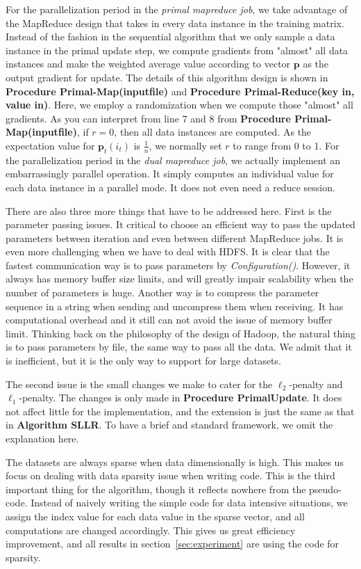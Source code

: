 \documentclass[10pt, conference, compsocconf]{IEEEtran}
\newcommand{\bp}{\mathbf{p}}
\begin{document}
For the parallelization period in the \textit{primal mapreduce job}, we take advantage of the MapReduce design that takes in every data instance in the training matrix.
Instead of the fashion in the sequential algorithm that we only sample a data instance in the primal update step, we compute gradients from "almost" all data instances and make the weighted average value according to vector $\bp$ as the output gradient for update.
The details of this algorithm design is shown in \textbf{Procedure Primal-Map(inputfile)} and \textbf{Procedure Primal-Reduce(key in, value in)}.
Here, we employ a randomization when we compute those "almost" all gradients.
As you can interpret from line 7 and 8 from \textbf{Procedure Primal-Map(inputfile)}, if $r=0$, then all data instances are computed.
As the expectation value for $\bp_t(i_t)$ is $\frac{1}{n}$, we normally set $r$ to range from 0 to 1.
For the parallelization period in the \textit{dual mapreduce job}, we actually implement an embarrassingly parallel operation.
It simply computes an individual value for each data instance in a parallel mode. It does not even need a reduce session.

There are also three more things that have to be addressed here.
First is the parameter passing issues. It critical to choose an efficient way to pass the updated parameters between iteration and even between different MapReduce jobs.
It is even more challenging when we have to deal with HDFS. It is clear that the fastest communication way is to pass parameters by \textit{Configuration()}.
However, it always has memory buffer size limits, and will greatly impair scalability when the number of parameters is huge.
Another way is to compress the parameter sequence in a string when sending and uncompress them when receiving. It has computational overhead and it still can not avoid the issue of memory buffer limit.
Thinking back on the philosophy of the design of Hadoop, the natural thing is to pass parameters by file, the same way to pass all the data.
We admit that it is inefficient, but it is the only way to support for large datasets.

The second issue is the small changes we make to cater for the $\ell_2$-penalty and $\ell_1$-penalty. The changes is only made in \textbf{Procedure PrimalUpdate}.
It does not affect little for the implementation, and the extension is just the same as that in \textbf{Algorithm SLLR}.
To have a brief and standard framework, we omit the explanation here.

The datasets are always sparse when data dimensionally is high. This makes us focus on dealing with data sparsity issue when writing code.
This is the third important thing for the algorithm, though it reflects nowhere from the pseudo-code.
Instead of naively writing the simple code for data intensive situations, we assign the index value for each data value in the sparse vector, and all computations are changed accordingly.
This gives us great efficiency improvement, and all results in section~\ref{sec:experiment} are using the code for sparsity.
\end{document}
